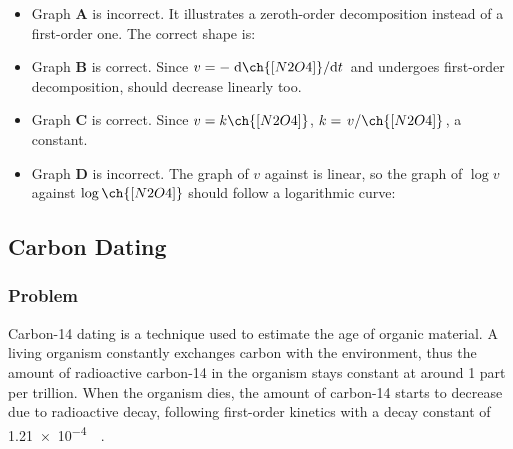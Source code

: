 \begin{itemize}
	\item Graph \textbf{A} is {\color{accent} incorrect}. It illustrates a zeroth-order decomposition instead of a first-order one. The correct shape is:
	      \begin{center}
	      \end{center}
	\item Graph \textbf{B} is {\color{accent} correct}. Since \(v = -\odv{\ch{[N2O4]}}/{t}\)
	      and  undergoes first-order decomposition, \ch{[N2O4]} should decrease
	      linearly too.
	\item Graph \textbf{C} is {\color{accent} correct}. Since \(v = k\ch{[N2O4]}\),
	      \(k = \slf{v}{\ch{[N2O4]}}\), a constant.
	\item Graph \textbf{D} is {\color{accent} incorrect}. The graph of \(v\) against
	      \ch{[N2O4]} is linear, so the graph of \(\log v\) against \(\log \ch{[N2O4]}\)
	      should follow a logarithmic curve:
	      \begin{center}
	      \end{center}
\end{itemize}

\subsection{Carbon Dating}
\subsubsection{Problem}
Carbon-14 dating is a technique used to estimate the age of organic material. A living organism constantly exchanges carbon with the environment, thus the amount
of radioactive carbon-14 in the organism stays constant at around 1 part per trillion.
When the organism dies, the amount of carbon-14 starts to decrease due to radioactive decay, following first-order kinetics with a decay constant of \qty{1.21e-4}{\per\year}.

